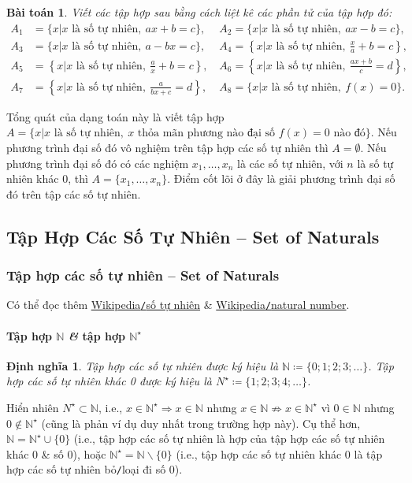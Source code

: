 \documentclass{article}
\numberwithin{equation}{section}
\newtheorem{dinhnghia}{Định nghĩa}[section]
\newtheorem{baitoan}{Bài toán}[section]
\begin{document}
\begin{baitoan}
	Viết các tập hợp sau bằng cách liệt kê các phần tử của tập hợp đó:
	\begin{align*}
		A_1 &= \{x|x\mbox{ là số tự nhiên},\ ax + b = c\},\ && A_2 = \{x|x\mbox{ là số tự nhiên},\ ax - b = c\},\\
		A_3 &= \{x|x\mbox{ là số tự nhiên},\ a - bx = c\},\ && A_4 = \left\{x|x\mbox{ là số tự nhiên},\ \frac{x}{a} + b = c\right\},\\
		A_5 &= \left\{x|x\mbox{ là số tự nhiên},\ \frac{a}{x} + b = c\right\},\ && A_6 = \left\{x|x\mbox{ là số tự nhiên},\ \frac{ax + b}{c} = d\right\},\\
		A_7 &= \left\{x|x\mbox{ là số tự nhiên},\ \frac{a}{bx + c} = d\right\},\ && A_8 = \{x|x\mbox{ là số tự nhiên},\ f(x) = 0\}.
	\end{align*}
\end{baitoan}
Tổng quát của dạng toán này là viết tập hợp $A = \{x|x\mbox{ là số tự nhiên},\ x \mbox{ thỏa mãn phương nào đại số }f(x) = 0\mbox{ nào đó}\}$. Nếu phương trình đại số đó vô nghiệm trên tập hợp các số tự nhiên thì $A = \emptyset$. Nếu phương trình đại số đó có các nghiệm $x_1,\ldots,x_n$ là các số tự nhiên, với $n$ là số tự nhiên khác 0, thì $A = \{x_1,\ldots,x_n\}$. Điểm cốt lõi ở đây là giải phương trình đại số đó trên tập các số tự nhiên.


\subsection{Tập Hợp Các Số Tự Nhiên -- Set of Naturals}

\subsubsection{Tập hợp các số tự nhiên -- Set of Naturals}
Có thể đọc thêm \href{https://vi.wikipedia.org/wiki/S%E1%BB%91_t%E1%BB%B1_nhi%C3%AAn}{Wikipedia\texttt{/}số tự nhiên} \& \href{https://en.wikipedia.org/wiki/Natural_number}{Wikipedia\texttt{/}natural number}.

\paragraph{Tập hợp $\mathbb{N}$ \textit{\&} tập hợp $\mathbb{N}^\star$}
\begin{dinhnghia}
	\emph{Tập hợp các số tự nhiên} được ký hiệu là $\mathbb{N}\coloneqq\{0;1;2;3;\ldots\}$. \emph{Tập hợp các số tự nhiên khác 0} được ký hiệu là $N^\star\coloneqq\{1;2;3;4;\ldots\}$.
\end{dinhnghia}
Hiển nhiên $N^\star\subset\mathbb{N}$, i.e., $x\in\mathbb{N}^\star\Rightarrow x\in\mathbb{N}$ nhưng $x\in\mathbb{N}\not\Rightarrow x\in\mathbb{N}^\star$ vì $0\in\mathbb{N}$ nhưng $0\notin\mathbb{N}^\star$ (cũng là phản ví dụ duy nhất trong trường hợp này). Cụ thể hơn, $\mathbb{N} = \mathbb{N}^\star\cup\{0\}$ (i.e., tập hợp các số tự nhiên là hợp của tập hợp các số tự nhiên khác 0 \& số 0), hoặc $\mathbb{N}^\star = \mathbb{N}\backslash\{0\}$ (i.e., tập hợp các số tự nhiên khác 0 là tập hợp các số tự nhiên bỏ\texttt{/}loại đi số 0).
\end{document}
